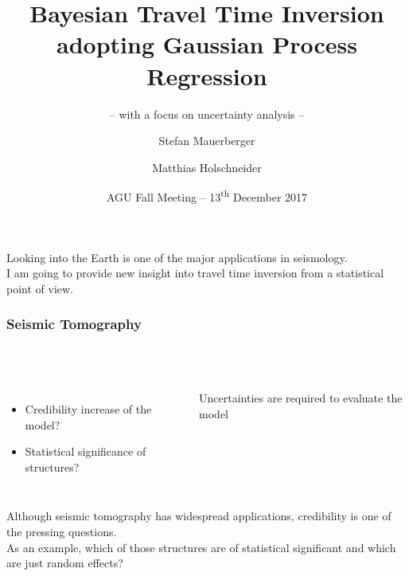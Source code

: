 \documentclass[aspectratio=169, t, 10pt,
    ]{beamer}
\title[Correlation based travel time inversion]{Bayesian Travel Time Inversion adopting Gaussian Process Regression}
\subtitle{-- with a focus on uncertainty analysis --}
\author[\tt mauerber@uni-potsdam.de]{Stefan Mauerberger \and Matthias Holschneider}
\institute[Math@UP]{University Potsdam, Institute of Mathematics}
\date[AGU~2017]{AGU Fall Meeting -- 13\textsuperscript{th} December 2017}
\begin{document}

Looking into the Earth is one of the major applications in seismology.
\\
I am going to provide new insight into travel time inversion from a statistical point of view.


\begin{frame}
    \frametitle{Seismic Tomography}
    \framesubtitle{~}%
%
\begin{columns}%
%
%
    \begin{itemize}
        \item Credibility increase of the model?
        \item Statistical significance of structures?
    \end{itemize}

    \begin{center}
        \large Uncertainties are required to evaluate the model
    \end{center}


    \vspace{-10mm}
    
\end{columns}

\end{frame}


Although seismic tomography has widespread applications, credibility is one of the pressing questions.
\\
As an example, which of those structures are of statistical significant and which are just random effects?
\\[2mm]
\end{document}
